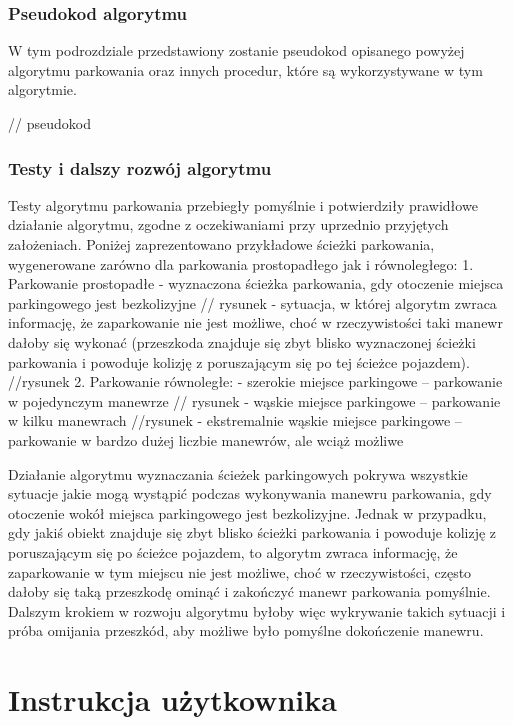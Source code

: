\documentclass[a4paper,11pt,twoside]{report}
\theoremstyle{definition}
\begin{document}
\subsection{Pseudokod algorytmu}

W tym podrozdziale przedstawiony zostanie pseudokod opisanego powyżej algorytmu parkowania oraz innych procedur, które są wykorzystywane w tym algorytmie.

// pseudokod

\subsection{Testy i dalszy rozwój algorytmu}

Testy algorytmu parkowania przebiegły pomyślnie i potwierdziły prawidłowe działanie algorytmu, zgodne z oczekiwaniami przy uprzednio przyjętych założeniach. Poniżej zaprezentowano przykładowe ścieżki parkowania, wygenerowane zarówno dla parkowania prostopadłego jak i równoległego: 
1.	Parkowanie prostopadłe
- wyznaczona ścieżka parkowania, gdy otoczenie miejsca parkingowego jest bezkolizyjne
// rysunek
- sytuacja, w której algorytm zwraca informację, że zaparkowanie nie jest możliwe, choć w rzeczywistości taki manewr dałoby się wykonać (przeszkoda znajduje się zbyt blisko wyznaczonej ścieżki parkowania i powoduje kolizję z poruszającym się po tej ścieżce pojazdem).
//rysunek
2.	Parkowanie równoległe:
- szerokie miejsce parkingowe – parkowanie w pojedynczym manewrze
// rysunek
- wąskie miejsce parkingowe – parkowanie w kilku manewrach
//rysunek
- ekstremalnie wąskie miejsce parkingowe – parkowanie w bardzo dużej liczbie manewrów, ale wciąż możliwe

Działanie algorytmu wyznaczania ścieżek parkingowych pokrywa wszystkie sytuacje jakie mogą wystąpić podczas wykonywania manewru parkowania, gdy otoczenie wokół miejsca parkingowego jest bezkolizyjne. Jednak w przypadku, gdy jakiś obiekt znajduje się zbyt blisko ścieżki parkowania i powoduje kolizję z poruszającym się po ścieżce pojazdem, to algorytm zwraca informację, że zaparkowanie w tym miejscu nie jest możliwe, choć w rzeczywistości, często dałoby się taką przeszkodę ominąć i zakończyć manewr parkowania pomyślnie.  Dalszym krokiem w rozwoju algorytmu byłoby więc wykrywanie takich sytuacji i próba omijania przeszkód, aby możliwe było pomyślne dokończenie manewru.


\chapter{Instrukcja użytkownika}
\end{document}
